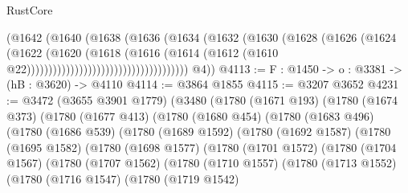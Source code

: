 \begin{lexlean}{RustCore}
\begin{coremodule}
                                                (@1642
                                                  (@1640
                                                    (@1638
                                                      (@1636
                                                        (@1634
                                                          (@1632
                                                            (@1630
                                                              (@1628
                                                                (@1626
                                                                  (@1624
                                                                    (@1622
                                                                      (@1620
                                                                        (@1618
                                                                          (@1616
                                                                            (@1614
                                                                              (@1612
                                                                                (@1610
                                                                                  @22)))))))))))))))))))))))))))))))))))))
        @4))
@4113 := {F : @1450} -> {o : @3381} -> (hB : @3620) -> @4110
@4114 := @3864 @1855
@4115 := @3207 @3652
@4231 := @3472
    (@3655 @3901 @1779)
    (@3480
      (@1780
        (@1671 @193)
        (@1780
          (@1674 @373)
          (@1780
            (@1677 @413)
            (@1780
              (@1680 @454)
              (@1780
                (@1683 @496)
                (@1780
                  (@1686 @539)
                  (@1780
                    (@1689 @1592)
                    (@1780
                      (@1692 @1587)
                      (@1780
                        (@1695 @1582)
                        (@1780
                          (@1698 @1577)
                          (@1780
                            (@1701 @1572)
                            (@1780
                              (@1704 @1567)
                              (@1780
                                (@1707 @1562)
                                (@1780
                                  (@1710 @1557)
                                  (@1780
                                    (@1713 @1552)
                                    (@1780
                                      (@1716 @1547)
                                      (@1780
                                        (@1719 @1542)

\end{coremodule}
\end{lexlean}
